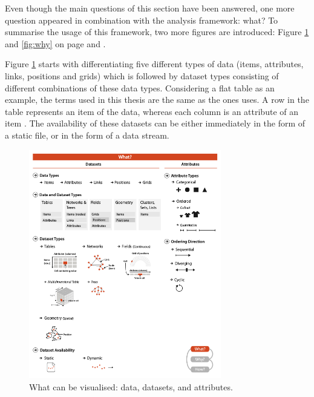 Even though the main questions of this section have been answered, one more question appeared in combination with the analysis framework: what? To summarise the usage of this framework, two more figures are introduced: Figure \ref{fig:what} and \ref{fig:why} on page \pageref{fig:what} and \pageref{fig:why}.

Figure \ref{fig:what} starts with differentiating five different types of data (items, attributes, links, positions and grids) which is followed by dataset types consisting of different combinations of these data types. Considering a flat table as an example, the terms used in this thesis are the same as the ones \citeauthor{Munzner2014} uses. A row in the table represents an item of the data, whereas each column is an attribute of an item . The availability of these datasets can be either immediately in the form of a static file, or in the form of a data stream.

\begin{figure}[!htb]
\centering
\includegraphics[height=10cm,keepaspectratio]{images/basics/what.png}
\caption[
    What can be visualised: data, datasets, and attributes .
]{What can be visualised: data, datasets, and attributes.}
\label{fig:what}
\end{figure}

